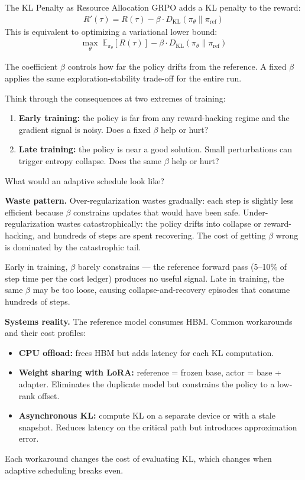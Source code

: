 \begin{thinkfirst}{The KL Penalty as Resource Allocation}
GRPO adds a KL penalty to the reward:
\begin{align*}
  R'(\tau) = R(\tau) - \beta \cdot D_{\mathrm{KL}}(\pi_\theta \| \pi_{\mathrm{ref}})
\end{align*}
This is equivalent to optimizing a variational lower bound:
\begin{align*}
  \max_\theta \; \mathbb{E}_{\pi_\theta}[R(\tau)] - \beta \cdot D_{\mathrm{KL}}(\pi_\theta \| \pi_{\mathrm{ref}})
\end{align*}

The coefficient $\beta$ controls how far the policy drifts from the reference. A fixed $\beta$ applies the same exploration-stability trade-off for the entire run.

Think through the consequences at two extremes of training:
\begin{enumerate}
  \item \textbf{Early training:} the policy is far from any reward-hacking regime and the gradient signal is noisy. Does a fixed $\beta$ help or hurt?
  \item \textbf{Late training:} the policy is near a good solution. Small perturbations can trigger entropy collapse. Does the same $\beta$ help or hurt?
\end{enumerate}
What would an adaptive schedule look like?
\end{thinkfirst}

\textbf{Waste pattern.} Over-regularization wastes gradually: each step is slightly less efficient because $\beta$ constrains updates that would have been safe. Under-regularization wastes catastrophically: the policy drifts into collapse or reward-hacking, and hundreds of steps are spent recovering. The cost of getting $\beta$ wrong is dominated by the catastrophic tail.

Early in training, $\beta$ barely constrains --- the reference forward pass (5--10\% of step time per the cost ledger) produces no useful signal. Late in training, the same $\beta$ may be too loose, causing collapse-and-recovery episodes that consume hundreds of steps.

\textbf{Systems reality.} The reference model consumes HBM. Common workarounds and their cost profiles:
\begin{itemize}
  \item \textbf{CPU offload:} frees HBM but adds latency for each KL computation.
  \item \textbf{Weight sharing with LoRA:} reference = frozen base, actor = base + adapter. Eliminates the duplicate model but constrains the policy to a low-rank offset.
  \item \textbf{Asynchronous KL:} compute KL on a separate device or with a stale snapshot. Reduces latency on the critical path but introduces approximation error.
\end{itemize}
Each workaround changes the cost of evaluating KL, which changes when adaptive scheduling breaks even.

